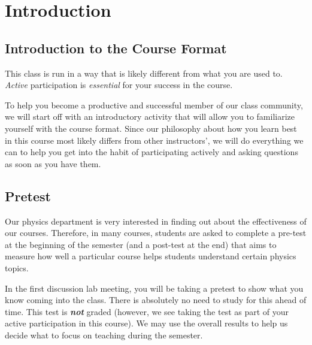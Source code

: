 \label{Unit0}

	
\chapter[Introduction]{Introduction}
	\section{Introduction to the Course Format}
		This class is run in a way that is likely different from what you are used to. {\em Active} participation is {\em essential} for your success in the course.
		
		To help you become a productive and successful member of our class community, we will start off with an introductory activity that will allow you to familiarize yourself with the course format. Since our philosophy about how you learn best in this course most likely differs from other instructors', we will do everything we can to help you get into the habit of participating actively and asking questions as soon as you have them.

	\section{Pretest}
		Our physics department is very interested in finding out about the effectiveness of our courses. Therefore, in many courses, students are asked to complete a pre-test at the beginning of the semester (and a post-test at the end) that aims to measure how well a particular course helps students understand certain physics topics.
		
		In the first discussion lab meeting, you will be taking a pretest to show what you know coming into the class. There is absolutely no need to study for this ahead of time. This test is \textbf{\emph{not}} graded (however, we see taking the test as part of your active participation in this course). We may use the overall results to help us decide what to focus on teaching during the semester.